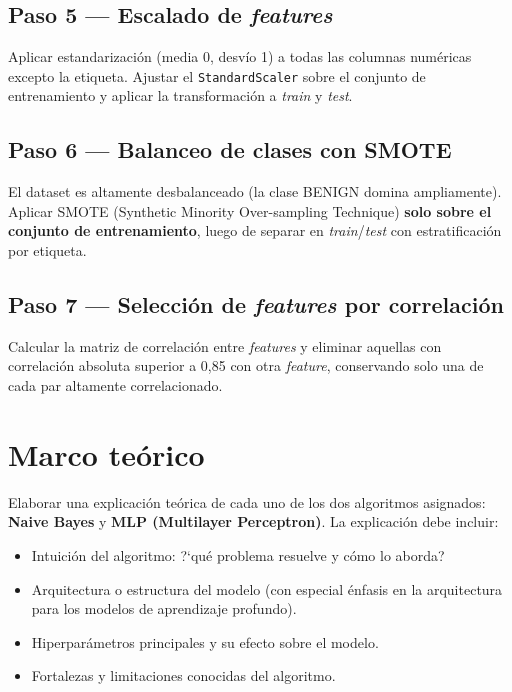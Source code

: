 \documentclass[11pt,a4paper]{article}
\newcommand{\codigo}[1]{\texttt{#1}}
\begin{document}
\subsection*{Paso 5 --- Escalado de \textit{features}}
Aplicar estandarizaci\'on (media 0, desv\'io 1) a todas las columnas num\'ericas excepto la etiqueta. Ajustar el \codigo{StandardScaler} sobre el conjunto de entrenamiento y aplicar la transformaci\'on a \textit{train} y \textit{test}.

\subsection*{Paso 6 --- Balanceo de clases con SMOTE}
El dataset es altamente desbalanceado (la clase BENIGN domina ampliamente). Aplicar SMOTE (Synthetic Minority Over-sampling Technique) \textbf{solo sobre el conjunto de entrenamiento}, luego de separar en \textit{train}/\textit{test} con estratificaci\'on por etiqueta.

\subsection*{Paso 7 --- Selecci\'on de \textit{features} por correlaci\'on}
Calcular la matriz de correlaci\'on entre \textit{features} y eliminar aquellas con correlaci\'on absoluta superior a 0,85 con otra \textit{feature}, conservando solo una de cada par altamente correlacionado.

\section{Marco te\'orico}
Elaborar una explicaci\'on te\'orica de cada uno de los dos algoritmos asignados: \textbf{Naive Bayes} y \textbf{MLP (Multilayer Perceptron)}. La explicaci\'on debe incluir:
\begin{itemize}[leftmargin=2em,itemsep=2pt]
    \item Intuici\'on del algoritmo: ?`qu\'e problema resuelve y c\'omo lo aborda?
    \item Arquitectura o estructura del modelo (con especial \'enfasis en la arquitectura para los modelos de aprendizaje profundo).
    \item Hiperpar\'ametros principales y su efecto sobre el modelo.
    \item Fortalezas y limitaciones conocidas del algoritmo.
\end{itemize}
\end{document}

